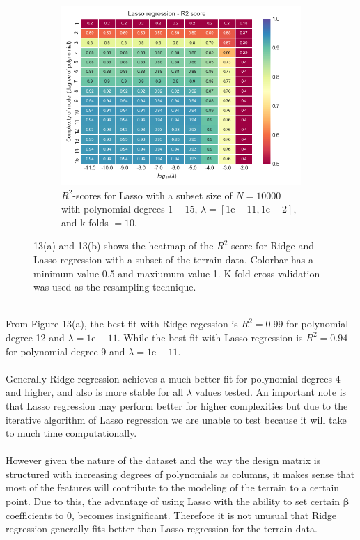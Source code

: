 \documentclass[a4paper,twocolumn]{article}
\newcommand{\B}{\boldsymbol{\beta}}
\begin{document}
\begin{figure}[ht]
    \begin{subfigure}[b]{0.9\columnwidth}
        \includegraphics[width=\columnwidth]{lambda_vs_complexity_heatmap_Lasso_N=10000_Noise=0.0_Degree=115.png}
        \caption{$R^{2}$-scores for Lasso with a subset size of $N=10000$ with polynomial degrees $1- 15$, $\lambda = [1\textrm{e}-11, 1\textrm{e}-2]$, and k-folds $= 10$.}
    \end{subfigure}
    \caption{13(a) and 13(b) shows the heatmap of the $R^{2}$-score for Ridge and Lasso regression with a subset of the terrain data. Colorbar has a minimum value 0.5 and maxiumum value 1. K-fold cross validation was used as the resampling technique.}
\end{figure}\\
From Figure 13(a), the best fit with Ridge regession is $R^{2}=0.99$ for polynomial degree 12 and $\lambda = 1\textrm{e}-11$. While the best fit with Lasso regression is $R^{2} = 0.94$ for polynomial degree 9 and $\lambda = 1\textrm{e}-11$. \\
\\
Generally Ridge regression achieves a much better fit for polynomial degrees 4 and higher, and also is more stable for all $\lambda$ values tested. An important note is that Lasso regression may perform better for higher complexities but due to the iterative algorithm of Lasso regression we are unable to test because it will take to much time computationally.\\
\\
However given the nature of the dataset and the way the design matrix is structured with increasing degrees of polynomials as columns, it makes sense that most of the features will contribute to the modeling of the terrain to a certain point. Due to this, the advantage of using Lasso with the ability to set certain $\B$ coefficients to 0, becomes insignificant. Therefore it is not unusual that Ridge regression generally fits better than Lasso regression for the terrain data.\\
\end{document}
